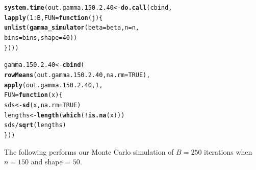 \documentclass[11pt]{article}\usepackage[]{graphicx}\usepackage[]{color}
\makeatletter
\newcommand{\hlnum}[1]{\textcolor[rgb]{0.686,0.059,0.569}{#1}}%
\newcommand{\hlopt}[1]{\textcolor[rgb]{0,0,0}{#1}}%
\newcommand{\hlstd}[1]{\textcolor[rgb]{0.345,0.345,0.345}{#1}}%
\newcommand{\hlkwa}[1]{\textcolor[rgb]{0.161,0.373,0.58}{\textbf{#1}}}%
\newcommand{\hlkwb}[1]{\textcolor[rgb]{0.69,0.353,0.396}{#1}}%
\newcommand{\hlkwc}[1]{\textcolor[rgb]{0.333,0.667,0.333}{#1}}%
\newcommand{\hlkwd}[1]{\textcolor[rgb]{0.737,0.353,0.396}{\textbf{#1}}}%
\newenvironment{kframe}{%
 \def\at@end@of@kframe{}%
 \ifinner\ifhmode%
  \def\at@end@of@kframe{\end{minipage}}%
  \begin{minipage}{\columnwidth}%
 \fi\fi%
 \def\FrameCommand##1{\hskip\@totalleftmargin \hskip-\fboxsep
 \colorbox{shadecolor}{##1}\hskip-\fboxsep
     \hskip-\linewidth \hskip-\@totalleftmargin \hskip\columnwidth}%
 \MakeFramed {\advance\hsize-\width
   \@totalleftmargin\z@ \linewidth\hsize
   \@setminipage}}%
 {\par\unskip\endMakeFramed%
 \at@end@of@kframe}
\newenvironment{knitrout}{}{} %
\makeatother
\begin{document}
\begin{knitrout}
\color{fgcolor}\begin{kframe}
\begin{alltt}
\hlkwd{system.time}\hlstd{(out.gamma.150.2.40} \hlkwb{<-} \hlkwd{do.call}\hlstd{(cbind,}
  \hlkwd{lapply}\hlstd{(}\hlnum{1}\hlopt{:}\hlstd{B,} \hlkwc{FUN} \hlstd{=} \hlkwa{function}\hlstd{(}\hlkwc{j}\hlstd{)\{}
    \hlkwd{unlist}\hlstd{(}\hlkwd{gamma_simulator}\hlstd{(}\hlkwc{beta} \hlstd{= beta,} \hlkwc{n} \hlstd{= n,}
      \hlkwc{bins} \hlstd{= bins,} \hlkwc{shape} \hlstd{=} \hlnum{40}\hlstd{))}
\hlstd{\})))}
\end{alltt}


{\ttfamily\noindent\bfseries\color{errorcolor}{\#\# Error in eval(family\$initialize): non-positive values not allowed for the 'gamma' family}}

{\ttfamily\noindent\itshape\color{messagecolor}{\#\# Timing stopped at: 0.005 0 0.004}}\end{kframe}
\end{knitrout}

\begin{knitrout}
\color{fgcolor}\begin{kframe}
\begin{alltt}
\hlstd{gamma.150.2.40} \hlkwb{<-} \hlkwd{cbind}\hlstd{(}
  \hlkwd{rowMeans}\hlstd{(out.gamma.150.2.40,} \hlkwc{na.rm} \hlstd{=} \hlnum{TRUE}\hlstd{),}
  \hlkwd{apply}\hlstd{(out.gamma.150.2.40,} \hlnum{1}\hlstd{,}
  \hlkwc{FUN} \hlstd{=} \hlkwa{function}\hlstd{(}\hlkwc{x}\hlstd{)\{}
    \hlstd{sds} \hlkwb{<-} \hlkwd{sd}\hlstd{(x,} \hlkwc{na.rm} \hlstd{=} \hlnum{TRUE}\hlstd{)}
    \hlstd{lengths} \hlkwb{<-} \hlkwd{length}\hlstd{(}\hlkwd{which}\hlstd{(}\hlopt{!}\hlkwd{is.na}\hlstd{(x)))}
    \hlstd{sds} \hlopt{/} \hlkwd{sqrt}\hlstd{(lengths)}
  \hlstd{\}))}
\end{alltt}


{\ttfamily\noindent\bfseries\color{errorcolor}{\#\# Error in is.data.frame(x): object 'out.gamma.150.2.40' not found}}\end{kframe}
\end{knitrout}

The following performs our Monte Carlo simulation of $B = 250$ iterations 
when $n = 150$ and shape = $50$.
\end{document}
